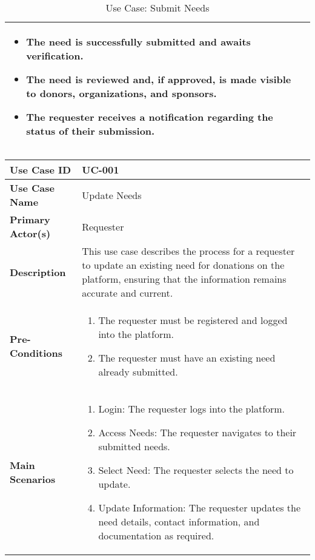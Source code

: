 \begin{table}[!ht]
\begin{tabularx}{\textwidth}{|l|X|}
\begin{itemize}[label=--,itemsep=0pt]
            \item The need is successfully submitted and awaits verification.
            \item The need is reviewed and, if approved, is made visible to donors, organizations, and sponsors.
            \item The requester receives a notification regarding the status of their submission.
        \end{itemize} \\
        \hline
    \end{tabularx}
    \label{tab:use-case-register}
    \caption{Use Case: Submit Needs}
\end{table}


\begin{table}[!ht]
    \centering
    \renewcommand{\arraystretch}{1.3} %
    \begin{tabularx}{\textwidth}{|l|X|}
        \hline
        \textbf{Use Case ID} & UC-001 \\
        \hline
        \textbf{Use Case Name} & Update Needs \\
        \hline
        \textbf{Primary Actor(s)} & Requester \\
        \hline
        \textbf{Description} & This use case describes the process for a requester to update an existing need for donations on the platform, ensuring that the information remains accurate and current.\\
        \hline
        \textbf{Pre-Conditions} & 
        \begin{enumerate}[label=\arabic*.,itemsep=0pt]
            \item The requester must be registered and logged into the platform.
            \item The requester must have an existing need already submitted.
        \end{enumerate} \\
        \hline
        \textbf{Main Scenarios} & 
        \begin{enumerate}[label=\arabic*.,itemsep=0pt]
            \item Login: The requester logs into the platform.
            \item Access Needs: The requester navigates to their submitted needs.
            \item Select Need: The requester selects the need to update.
            \item Update Information: The requester updates the need details, contact information, and documentation as required.

\end{enumerate}
\end{tabularx}
\end{table}
